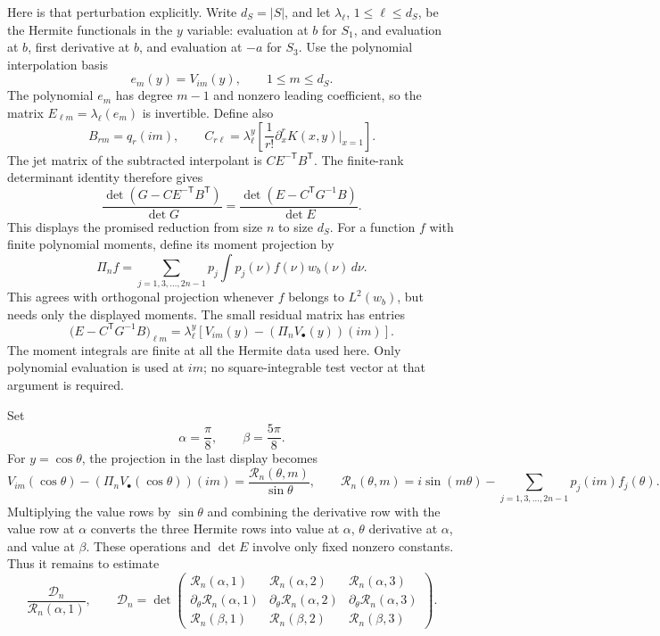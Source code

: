 \documentclass[11pt]{article}
\numberwithin{equation}{section}
\theoremstyle{definition}\newtheorem{definition}[theorem]{Definition}
\theoremstyle{remark}\newtheorem{remark}[theorem]{Remark}
\begin{document}
Here is that perturbation explicitly. Write $d_S=|S|$, and let
$\lambda_\ell$, $1\le \ell\le d_S$, be the Hermite functionals in the
$y$ variable: evaluation at $b$ for $S_1$, and evaluation at $b$,
first derivative at $b$, and evaluation at $-a$ for $S_3$.
Use the polynomial interpolation basis
\[
 e_m(y)=V_{im}(y),\qquad 1\le m\le d_S.
\]
The polynomial $e_m$ has degree $m-1$ and nonzero leading coefficient,
so the matrix $E_{\ell m}=\lambda_\ell(e_m)$ is invertible. Define also
\[
 B_{rm}=q_r(im),\qquad
 C_{r\ell}=\lambda_\ell^y\left[
           \frac1{r!}\partial_x^r K(x,y)\big|_{x=1}\right].
\]
The jet matrix of the subtracted interpolant is $CE^{-\mathsf T}B^{\mathsf T}$.
The finite-rank determinant identity therefore gives
\[
 \frac{\det(G-CE^{-\mathsf T}B^{\mathsf T})}{\det G}
 =\frac{\det(E-C^{\mathsf T}G^{-1}B)}{\det E}.
\]
This displays the promised reduction from size $n$ to size $d_S$.
For a function $f$ with finite polynomial moments, define its moment
projection by
\[
 \Pi_n f=\sum_{j=1,3,\ldots,2n-1}p_j\int p_j(\nu)f(\nu)w_b(\nu)\,d\nu.
\]
This agrees with orthogonal projection whenever $f$ belongs to $L^2(w_b)$,
but needs only the displayed moments. The small residual matrix has entries
\[
 \big(E-C^{\mathsf T}G^{-1}B\big)_{\ell m}
 =\lambda_\ell^y\left[V_{im}(y)
             -(\Pi_n V_{\bullet}(y))(im)\right].
\]
The moment integrals are finite at all the Hermite data used here.
Only polynomial evaluation is used at $im$; no square-integrable test
vector at that argument is required.

Set
\[
 \alpha=\frac\pi8,\qquad \beta=\frac{5\pi}8.
\]
For $y=\cos\theta$, the projection in the last display becomes
\[
 V_{im}(\cos\theta)
       -(\Pi_n V_{\bullet}(\cos\theta))(im)
 =\frac{\mathscr R_n(\theta,m)}{\sin\theta},
 \qquad
 \mathscr R_n(\theta,m)=i\sin(m\theta)
       -\sum_{j=1,3,\ldots,2n-1}p_j(im)f_j(\theta).
\]
Multiplying the value rows by $\sin\theta$ and combining the derivative
row with the value row at $\alpha$ converts the three Hermite rows into
value at $\alpha$, $\theta$ derivative at $\alpha$, and value at $\beta$.
These operations and $\det E$ involve only fixed nonzero constants.
Thus it remains to estimate
\[
 \frac{\mathscr D_n}{\mathscr R_n(\alpha,1)},\qquad
 \mathscr D_n=
 \det\begin{pmatrix}
 \mathscr R_n(\alpha,1)&\mathscr R_n(\alpha,2)&\mathscr R_n(\alpha,3)\\
 \partial_\theta \mathscr R_n(\alpha,1)&\partial_\theta \mathscr R_n(\alpha,2)&
                  \partial_\theta \mathscr R_n(\alpha,3)\\
 \mathscr R_n(\beta,1)&\mathscr R_n(\beta,2)&\mathscr R_n(\beta,3)
 \end{pmatrix}.
\]
\end{document}

